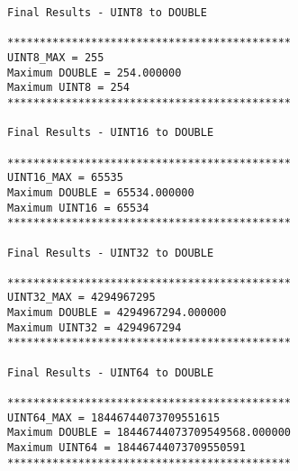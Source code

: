 \begin{verbatim}
Final Results - UINT8 to DOUBLE

********************************************
UINT8_MAX = 255
Maximum DOUBLE = 254.000000
Maximum UINT8 = 254
********************************************

Final Results - UINT16 to DOUBLE

********************************************
UINT16_MAX = 65535
Maximum DOUBLE = 65534.000000
Maximum UINT16 = 65534
********************************************

Final Results - UINT32 to DOUBLE

********************************************
UINT32_MAX = 4294967295
Maximum DOUBLE = 4294967294.000000
Maximum UINT32 = 4294967294
********************************************

Final Results - UINT64 to DOUBLE

********************************************
UINT64_MAX = 18446744073709551615
Maximum DOUBLE = 18446744073709549568.000000
Maximum UINT64 = 18446744073709550591
********************************************

\end{verbatim}

\begin{comment}

About conversion...

Actually that is what happens:
      if (nc_def_var(ncid, VAR1_NAME, NC_BYTE, 1, dimids, &varid)) ERR;
      if (nc_enddef(ncid)) ERR;
      if (nc_put_var_uchar(ncid, varid, uchar_out) != NC_ERANGE) ERR;

I found this in the documentation:
> BUT netcdf library returns NC_BYTE data as 8-bit signed
> integers (instead of 8-bit unsigned integers)
> so that NC_BYTE values go from 0 to 127 and then from -128 to -1
> instead of going from 0 to 255 as wanted.

That explains it, right?
https://www.unidata.ucar.edu/software/netcdf/docs_rc/group__variables.html#gac6e82a7c808f1e3c895616415ffa8e5d

The shit function assumes we convert the variable data *on the fly* while writing to the file…

As we are not converting the data type or anything here, we are not supporting this.
I reckon, we should check for any function which NC type does not match our expected type, write an error and abort.
I’m not intending to support this (ever)...

LR. Was this not the point of having the conversion inside smd? At least between the types we support? I also checked something in the documentation and they don’t do it between char and numbers.

The difference is that one is for ATTRIBUTES and one for VARIABLES, SMD is not involved in VARIABLES and hopefully never be as this is a performance problem.
We *might* be able to do part of this, in case COMPRESSION is turned on, as we then have to do a conversion anyway!
Document it this way.

\end{comment}

